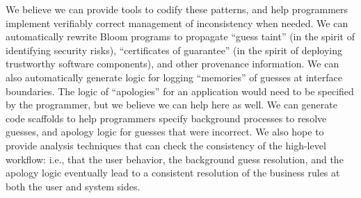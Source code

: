We believe we can provide tools to codify these patterns, and help programmers implement verifiably correct management of inconsistency when needed.  We can automatically rewrite Bloom programs to propagate ``guess taint'' (in the spirit of identifying security risks), ``certificates of guarantee'' (in the spirit of deploying trustworthy software components), and other provenance information.  We can also automatically generate logic for logging ``memories'' of guesses at interface boundaries.  The logic of ``apologies'' for an application would need to be specified by the programmer, but we believe we can help here as well.  We can generate code scaffolds to help programmers specify background processes to resolve guesses, and apology logic for guesses that were incorrect.  We also hope to provide analysis techniques that can check the consistency of the high-level workflow: i.e., that the user behavior, the background guess resolution, and the apology logic eventually lead to a consistent resolution of the business rules at both the user and system sides.